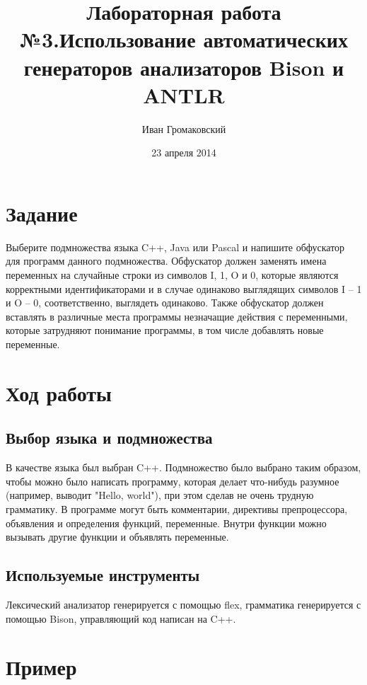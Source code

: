 \documentclass[a4paper]{article}
\begin{document}
\title{Лабораторная работа №3.Использование автоматических генераторов анализаторов Bison и ANTLR}
\author{Иван Громаковский}
\date{23 апреля 2014}
\maketitle

\section{Задание}

Выберите подмножества языка C++, Java или Pascal и напишите обфускатор для программ данного подмножества. Обфускатор должен заменять имена переменных на случайные строки из символов I, 1, O и 0, которые являются корректными идентификаторами и в случае одинаково выглядящих символов I – 1 и O – 0, соответственно, выглядеть одинаково. Также обфускатор должен вставлять в различные места программы незначащие действия с переменными, которые затрудняют понимание программы, в том числе добавлять новые переменные.

\section{Ход работы}
\subsection{Выбор языка и подмножества}

В качестве языка был выбран C++. Подмножество было выбрано таким образом, чтобы можно было написать программу, которая делает что-нибудь разумное (например, выводит "Hello, world"), при этом сделав не очень трудную грамматику.
В программе могут быть комментарии, директивы препроцессора, объявления и определения функций, переменные. Внутри функции можно вызывать другие функции и объявлять переменные.

\subsection{Используемые инструменты}

Лексический анализатор генерируется с помощью flex, грамматика генерируется с помощью Bison, управляющий код написан на C++.

\section{Пример}
\end{document}
